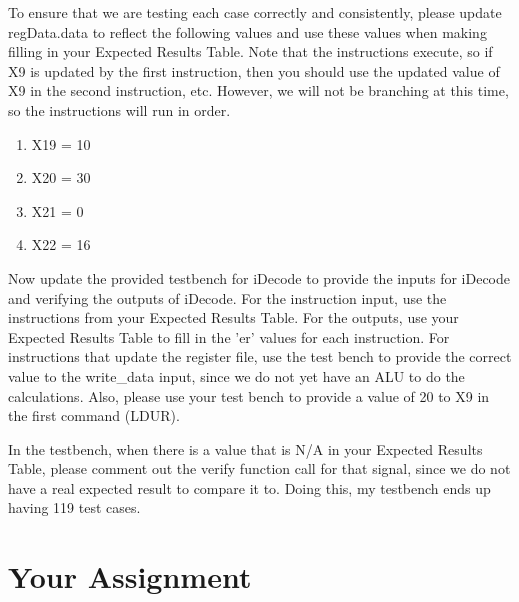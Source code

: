 To ensure that we are testing each case correctly and consistently, please update regData.data to reflect the following values and use these values when making filling in your Expected Results Table.  Note that the instructions execute, so if X9 is updated by the first instruction, then you should use the updated value of X9 in the second instruction, etc.  However, we will not be branching at this time, so the instructions will run in order.

\begin{enumerate}
	\item X19 = 10
	\item X20 = 30
	\item X21 = 0
	\item X22 = 16
\end{enumerate}

Now update the provided testbench for iDecode to provide the inputs for iDecode and verifying the outputs of iDecode.  For the instruction input, use the instructions from your Expected Results Table.  For the outputs, use your Expected Results Table to fill in the 'er' values for each instruction.  For instructions that update the register file, use the test bench to provide the correct value to the write\_data input, since we do not yet have an ALU to do the calculations.  Also, please use your test bench to provide a value of 20 to X9 in the first command (LDUR).

In the testbench, when there is a value that is N/A in your Expected Results Table, please comment out the verify function call for that signal, since we do not have a real expected result to compare it to.  Doing this, my testbench ends up having 119 test cases.

\section{Your Assignment}

